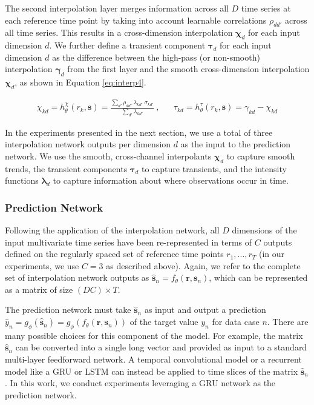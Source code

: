\documentclass{article} \usepackage{iclr2019_conference,times}
\newcommand{\mbf}[1]{\mathbf{#1}}
\begin{document}
The second interpolation layer merges information across all $D$
time series at each reference time point by taking into account
learnable correlations $\rho_{dd'}$ across all time series. This
results in a cross-dimension interpolation $\bm{\chi}_{d}$ for 
each input dimension $d$. We further define a transient component  
$\bm{\tau}_{d}$ for each input dimension $d$ as the difference between
the high-pass (or non-smooth) interpolation $\bm{\gamma}_{d}$  from the first layer and the
smooth cross-dimension interpolation  $\bm{\chi}_{d}$, as shown in Equation \ref{eq:interp4}. 

\vspace{-1mm}
\begin{align}
 \label{eq:interp4}
 \chi_{kd} = h_\theta^\chi(r_k, \mbf{s})=\frac{\sum_{d'} \rho_{dd'} \: \lambda_{kd'} \: \sigma_{kd'}}{\sum_{d'} \lambda_{kd'}} \: , &&
 \tau_{kd} = h_\theta^\tau(r_k, \mbf{s}) =  \gamma_{kd} - \chi_{kd}
\end{align}

In the experiments presented in the next section, we use a total of three
interpolation network outputs per dimension $d$ as the input to the prediction network.
We use the smooth, cross-channel interpolants $\bm{\chi}_d$ to capture
smooth trends, the transient components $\bm{\tau}_d$ to capture transients, and the 
intensity functions $\bm{\lambda}_d$ to capture information about where observations occur in time. 


\subsubsection{Prediction Network} Following the application of the 
interpolation network, all $D$ dimensions of the input multivariate time series have been
re-represented in terms of $C$ outputs defined on the regularly spaced 
set of reference time points $r_1,...,r_T$ (in our
experiments, we use $C=3$ as described above).
Again, we refer to the complete set of interpolation network outputs 
as $\hat{\mathbf{s}}_{n}=f_{\theta}(\mbf{r},\mbf{s}_n)$, which can be represented as a matrix
of size $(DC)\times T$. 

The prediction network must take $\hat{\mathbf{s}}_{n}$ as input and
output a prediction $\hat{y}_n=g_{\phi}(\hat{\mbf{s}}_n)=
g_{\phi}(f_{\theta}(\mbf{r},\mbf{s}_n))$ of the target value $y_n$
for data case $n$. There are many possible choices for this
component of the model. For example, the matrix $\hat{\mathbf{s}}_{n}$ 
can be converted into a single long vector and provided as 
input to a standard multi-layer feedforward network. 
A temporal convolutional model or a recurrent model like a 
GRU or LSTM can instead be applied to time slices of the 
matrix $\hat{\mathbf{s}}_{n}$. In this work, we conduct experiments
leveraging a GRU network as the prediction network.
\end{document}
